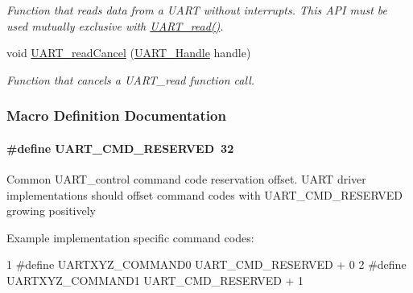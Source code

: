 \begin{DoxyCompactItemize}
\begin{DoxyCompactList}\small\item\em Function that reads data from a U\+A\+R\+T without interrupts. This A\+P\+I must be used mutually exclusive with \hyperlink{_u_a_r_t_8h_a023152d57539cad94bdd813956013e73}{U\+A\+R\+T\+\_\+read()}. \end{DoxyCompactList}\item 
void \hyperlink{_u_a_r_t_8h_a51ed7e94d5b409ca1fcb2d65c5a25c3c}{U\+A\+R\+T\+\_\+read\+Cancel} (\hyperlink{_u_a_r_t_8h_a13cc669fae768d8212e6491ce71b28af}{U\+A\+R\+T\+\_\+\+Handle} handle)
\begin{DoxyCompactList}\small\item\em Function that cancels a U\+A\+R\+T\+\_\+read function call. \end{DoxyCompactList}\end{DoxyCompactItemize}


\subsubsection{Macro Definition Documentation}
\paragraph[{U\+A\+R\+T\+\_\+\+C\+M\+D\+\_\+\+R\+E\+S\+E\+R\+V\+E\+D}]{\setlength{\rightskip}{0pt plus 5cm}\#define U\+A\+R\+T\+\_\+\+C\+M\+D\+\_\+\+R\+E\+S\+E\+R\+V\+E\+D~32}\label{_u_a_r_t_8h_a0f5a809e0884da33fef102236eb51644}
Common U\+A\+R\+T\+\_\+control command code reservation offset. U\+A\+R\+T driver implementations should offset command codes with U\+A\+R\+T\+\_\+\+C\+M\+D\+\_\+\+R\+E\+S\+E\+R\+V\+E\+D growing positively

Example implementation specific command codes\+: 
\begin{DoxyCode}
1 #define UARTXYZ\_COMMAND0         UART\_CMD\_RESERVED + 0
2 #define UARTXYZ\_COMMAND1         UART\_CMD\_RESERVED + 1
\end{DoxyCode}
